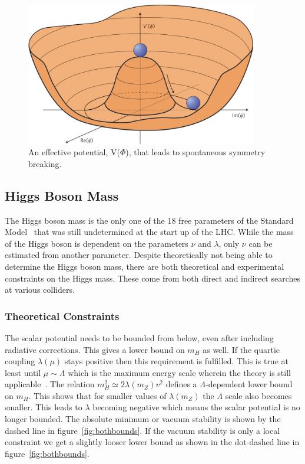 \begin{figure}[htb]
\centering
\includegraphics[width=0.9\textwidth]{StandardModel/higgs_potential.jpg}
\caption{\small An effective potential, V($\Phi$), that leads to spontaneous symmetry breaking.~\cite{Eyeonaprize2011} }
\label{fig:higgs_potential}
\end{figure}



\subsection{Higgs Boson Mass}

The Higgs boson mass is the only one of the 18 free parameters of the Standard Model~\cite{Englert1964} that was still undetermined at the start up of the LHC. While the mass of the Higgs boson is dependent on the parameters $\nu$ and $\lambda$, only $\nu$ can be estimated from another parameter.  Despite theoretically not being able to determine the Higgs boson mass, there are both theoretical and experimental constraints on the Higgs mass.  These come from both direct and indirect searches at various colliders.


\subsubsection{Theoretical Constraints}


The scalar potential needs to be bounded from below, even after including radiative corrections.  This gives a lower bound on $m_H$ as well.  If the quartic coupling $\lambda(\mu)$ stays positive then this requirement is fulfilled.  This is true at least until $\mu\sim\Lambda$ which is the maximum energy scale wherein the theory is still applicable~\cite{Ridolfi2001}. The relation $m_H^2\simeq 2\lambda(m_Z)v^2$ defines a $\Lambda$-dependent lower bound on $m_H$. This shows that for smaller values of $\lambda(m_Z)$ the $\Lambda$ scale also becomes smaller.  This leads to $\lambda$ becoming negative which means the scalar potential is no longer bounded.  The absolute minimum or vacuum stability is shown by the dashed line in figure~\ref{fig:bothbounds}. If the vacuum stability is only a local constraint we get a slightly looser lower bound as shown in the dot-dashed line in figure~\ref{fig:bothbounds}.


